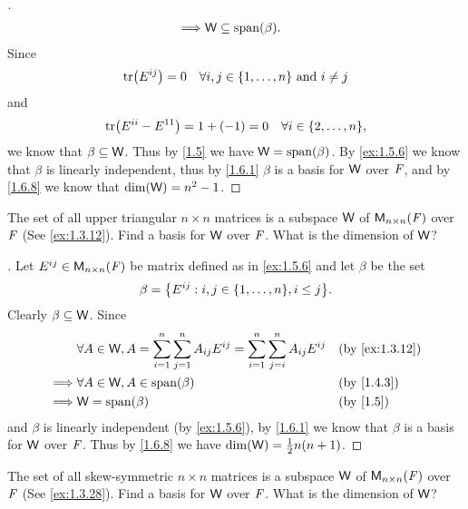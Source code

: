 \begin{proof}[]
\begin{align*}
		\implies & \W \subseteq \spn{\beta}.
	\end{align*}
	Since
	\[
		\tr[E^{i j}] = 0 \quad \forall i, j \in \set{1, \dots, n} \text{ and } i \neq j
	\]
	and
	\[
		\tr[E^{i i} - E^{1 1}] = 1 + (-1) = 0 \quad \forall i \in \set{2, \dots, n},
	\]
	we know that \(\beta \subseteq \mathsf{W}\).
	Thus by \cref{1.5} we have \(\W = \spn{\beta}\).
	By \cref{ex:1.5.6} we know that \(\beta\) is linearly independent, thus by \cref{1.6.1} \(\beta\) is a basis for \(\mathsf{W}\) over \(\mathit{F}\), and by \cref{1.6.8} we know that \(\dim(\mathsf{W}) = n^2 - 1\).
\end{proof}

\begin{ex}\label{ex:1.6.16}
	The set of all upper triangular \(n \times n\) matrices is a subspace \(\mathsf{W}\) of \(\mathsf{M}_{{n} \times n}({\mathit{F}})\) over \(\mathit{F}\) (See \cref{ex:1.3.12}).
	Find a basis for \(\mathsf{W}\) over \(\mathit{F}\).
	What is the dimension of \(\mathsf{W}\)?
\end{ex}

\begin{proof}[]
	Let \(E^{i j} \in \mathsf{M}_{{n} \times n}({\mathit{F}})\) be matrix defined as in \cref{ex:1.5.6} and let \(\beta\) be the set
	\[
		\beta = \set{E^{i j} : i, j \in \set{1, \dots, n}, i \leq j}.
	\]
	Clearly \(\beta \subseteq \mathsf{W}\).
	Since
	\begin{align*}
		         & \forall A \in \W, A = \sum_{i = 1}^n \sum_{j = 1}^n A_{i j} E^{i j} = \sum_{i = 1}^n \sum_{j = i}^n A_{i j} E^{i j} &  & \by{ex:1.3.12} \\
		\implies & \forall A \in \W, A \in \spn{\beta}                                                                                 &  & \by{1.4.3}     \\
		\implies & \W = \spn{\beta}                                                                                                    &  & \by{1.5}
	\end{align*}
	and \(\beta\) is linearly independent (by \cref{ex:1.5.6}), by \cref{1.6.1} we know that \(\beta\) is a basis for \(\mathsf{W}\) over \(\mathit{F}\).
	Thus by \cref{1.6.8} we have \(\dim(\mathsf{W}) = \frac{1}{2} n(n + 1)\).
\end{proof}

\begin{ex}\label{ex:1.6.17}
	The set of all skew-symmetric \(n \times n\) matrices is a subspace \(\mathsf{W}\) of \(\mathsf{M}_{{n} \times n}({\mathit{F}})\) over \(\mathit{F}\) (See \cref{ex:1.3.28}).
	Find a basis for \(\mathsf{W}\) over \(\mathit{F}\).
	What is the dimension of \(\mathsf{W}\)?
\end{ex}

